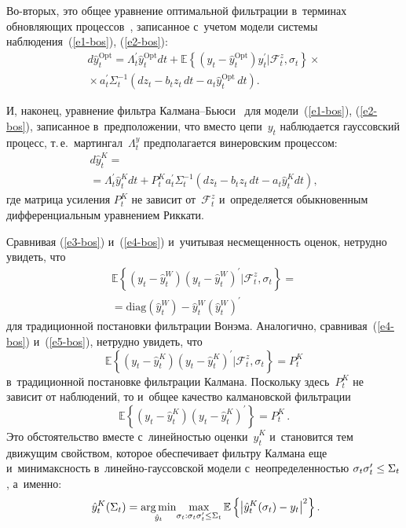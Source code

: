 \begin{multicols}{2}
     Во-вторых, это общее уравнение оптимальной фильт\-ра\-ции в~терминах 
об\-нов\-ля\-ющих процессов~\cite{3-bos}, записанное с~учетом модели сис\-те\-мы 
наблюдения~(\ref{e1-bos}), (\ref{e2-bos}):
     \begin{multline}
     d\hat{y}_t^{\mathrm{Opt}} =\Lambda_t^\prime \hat{y}_t^{\mathrm{Opt}} dt+\mathbb{E} 
\left\{ \left( y_t -\hat{y}_t^{\mathrm{Opt}}\right) y_t^\prime \vert \mathcal{F}_t^z, 
\sigma_t\right\} \times{}\\
{}\times a_t^\prime \Sigma_t^{-1} \left( dz_t - b_t z_t\, dt -a_t 
\hat{y}_t^{\mathrm{Opt}} \,dt\right).
     \label{e4-bos}
     \end{multline}
     
     И, наконец, уравнение фильтра  
Кал\-ма\-на--Бью\-си~\cite{19-bos, 20-bos} для модели~(\ref{e1-bos}), (\ref{e2-bos}), записанное 
в~предположении, что вмес\-то цепи~$y_t$ наблюдается гауссовский процесс, 
т.\,е.\ мартингал~$\Lambda_t^y$ предполагается винеровским процессом: 
     \begin{multline}
     d\hat{y}_t^K ={}\\
     \!{}=\Lambda_t^\prime \hat{y}_t^K dt+ P_t^K a_t^\prime 
\Sigma_t^{-1} \left( dz_t -b_t z_t \,dt -a_t \hat{y}_t^K dt\right),\!
     \label{e5-bos}
     \end{multline}
где матрица усиления $P_t^{K}$ не зависит от~$\mathcal{F}_t^z$ 
и~определяется обыкновенным дифференциальным уравнением Риккати.
     
     Сравнивая (\ref{e3-bos}) и~(\ref{e4-bos}) и~учитывая не\-сме\-щен\-ность оценок, не\-труд\-но 
увидеть, что 
\begin{multline*}
\mathbb{E}\left\{ \left( y_t- \hat{y}_t^W\right) \left( y_t - 
\hat{y}_t^W\right)^\prime \vert \mathcal{F}_t^z, \sigma_t\right\} = {}\\
{}=
\mathrm{diag}\left( \hat{y}_t^W\right)- \hat{y}_t^W\left( 
\hat{y}_t^W\right)^\prime
\end{multline*} 
для традиционной по\-ста\-нов\-ки фильт\-ра\-ции 
Вонэма. Аналогично, сравнивая~(\ref{e4-bos}) и~(\ref{e5-bos}), нетрудно увидеть, что 
$$
\mathbb{E}\left\{ \left( y_t- \hat{y}_t^K\right) \left( y_t- 
\hat{y}_t^K\right)^\prime \vert \mathcal{F}_t^z, \sigma_t\right\} = P_t^K
$$ 
в~традиционной по\-ста\-нов\-ке фильт\-ра\-ции Калмана. Поскольку здесь~$P_t^K$ не 
зависит от наблюдений, то и~общее качество калмановской фильт\-ра\-ции 
$$
\mathbb{E}\left\{ \left( y_t- \hat{y}_t^K\right) \left( y_t- 
\hat{y}_t^K\right)^\prime\right\} = P_t^K\,.
$$
 Это обстоятельство вместе 
с~ли\-ней\-ностью оценки~$\hat{y}_t^K$ и~становится тем движущим 
свойством, которое обеспечивает фильт\-ру Калмана еще и~ми\-ни\-макс\-ность  
в~ли\-ней\-но-га\-ус\-сов\-ской модели с~не\-опре\-де\-лен\-ностью $\sigma_t 
\sigma_t^\prime \hm\leq \Sigma_t$, а~именно:
     \begin{equation}
\hat{y}_t^K(\Sigma_t) =\mathop{\mathrm{arg}\,\mathrm{min}}\limits_{\hat{y}_t}\! \max\limits_{\sigma_t: 
\sigma_t\sigma_t^\prime \leq \Sigma_t} \mathbb{E} \left\{ \left\vert \hat{y}_t^K 
(\sigma_t) -y_t \right\vert^2 \right\}.\!\!
     \label{e6-bos}
     \end{equation}
     

\end{multicols}
